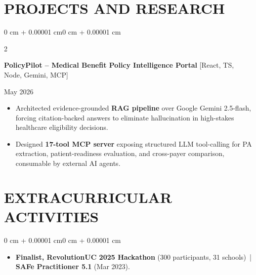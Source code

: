 \documentclass[10pt, letterpaper]{article}
\newenvironment{highlights}{
    \begin{itemize}[
        topsep=0.10 cm,
        parsep=0.06 cm,
        partopsep=0pt,
        itemsep=0.06 cm,
        leftmargin=12pt
    ]
}{
    \end{itemize}
}
\newenvironment{onecolentry}{
    \begin{adjustwidth}{0 cm + 0.00001 cm}{0 cm + 0.00001 cm}
}{
    \end{adjustwidth}
}
\newenvironment{twocolentry}[2][]{
    \onecolentry
    \def\secondColumn{#2}
    \setcolumnwidth{\fill, 4.5 cm}
    \begin{paracol}{2}
}{
    \switchcolumn \raggedleft \secondColumn
    \end{paracol}
    \endonecolentry
}
\begin{document}
\section{PROJECTS AND RESEARCH}
\begin{twocolentry}{May 2026}
\textbf{PolicyPilot -- Medical Benefit Policy Intelligence Portal} [React, TS, Node, Gemini, MCP]
\end{twocolentry}
\begin{highlights}
  \item Architected evidence-grounded \textbf{RAG pipeline} over Google Gemini 2.5-flash, forcing citation-backed answers to eliminate hallucination in high-stakes healthcare eligibility decisions.
  \item Designed \textbf{17-tool MCP server} exposing structured LLM tool-calling for PA extraction, patient-readiness evaluation, and cross-payer comparison, consumable by external AI agents.
\end{highlights}

\section{EXTRACURRICULAR ACTIVITIES}
\begin{onecolentry}
\begin{highlights}
  \item \textbf{Finalist, RevolutionUC 2025 Hackathon} (300 participants, 31 schools) \,|\, \textbf{SAFe Practitioner 5.1} (Mar 2023).
\end{highlights}
\end{onecolentry}
\end{document}
